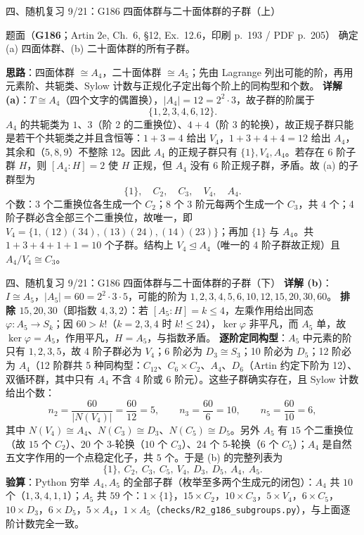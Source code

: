 \documentclass[aspectratio=169,10pt,fontset=none]{ctexbeamer}
\newcommand{\ex}[1]{\textcolor{accent}{\footnotesize\bfseries #1}}
\newcommand{\key}[1]{\textcolor{ink}{\bfseries #1}}
\begin{document}
\begin{frame}[t]{四、随机复习 9/21：G186 四面体群与二十面体群的子群（上）}
\label{ex:G186}
\scriptsize
\begin{block}{\footnotesize 题面（\ex{G186}；Artin 2e, Ch.~6, §12, Ex.~12.6，印刷 p.~193 / PDF p.~205）}
确定 (a) 四面体群、(b) 二十面体群的所有子群。
\end{block}
\key{思路}：四面体群 $\cong A_4$，二十面体群 $\cong A_5$；先由 Lagrange 列出可能的阶，再用元素阶、共轭类、Sylow 计数与正规化子定出每个阶上的同构型和个数。
\key{详解 (a)}：$T\cong A_4$（四个文字的偶置换），$|A_4|=12=2^2\cdot3$，故子群的阶属于
\[ \{1,2,3,4,6,12\}. \]
$A_4$ 的共轭类为 $1$、$3$（阶 2 的二重换位）、$4+4$（阶 3 的轮换），故正规子群只能是若干个共轭类之并且含恒等：$1+3=4$ 给出 $V_4$，$1+3+4+4=12$ 给出 $A_4$，其余和（$5,8,9$）不整除 $12$。因此 $A_4$ 的正规子群只有 $\{1\},V_4,A_4$。若存在 6 阶子群 $H$，则 $[A_4:H]=2$ 使 $H$ 正规，但 $A_4$ 没有 6 阶正规子群，矛盾。故 (a) 的子群型为
\[ \{1\},\quad C_2,\quad C_3,\quad V_4,\quad A_4. \]
个数：$3$ 个二重换位各生成一个 $C_2$；$8$ 个 3 阶元每两个生成一个 $C_3$，共 $4$ 个；4 阶子群必含全部三个二重换位，故唯一，即 $V_4=\{1,(12)(34),(13)(24),(14)(23)\}$；再加 $\{1\}$ 与 $A_4$。共 $1+3+4+1+1=10$ 个子群。结构上 $V_4\trianglelefteq A_4$（唯一的 4 阶子群故正规）且 $A_4/V_4\cong C_3$。
\end{frame}

\begin{frame}[t]{四、随机复习 9/21：G186 四面体群与二十面体群的子群（下）}
\scriptsize
\key{详解 (b)}：$I\cong A_5$，$|A_5|=60=2^2\cdot3\cdot5$，可能的阶为 $1,2,3,4,5,6,10,12,15,20,30,60$。
\textbf{排除 $15,20,30$}（即指数 $4,3,2$）：若 $[A_5:H]=k\le4$，左乘作用给出同态 $\varphi:A_5\to S_k$；因 $60>k!$（$k=2,3,4$ 时 $k!\le24$），$\ker\varphi$ 非平凡，而 $A_5$ 单，故 $\ker\varphi=A_5$，作用平凡，$H=A_5$，与指数矛盾。
\textbf{逐阶定同构型}：$A_5$ 中元素的阶只有 $1,2,3,5$，故 4 阶子群必为 $V_4$；6 阶必为 $D_3\cong S_3$；10 阶必为 $D_5$；12 阶必为 $A_4$（12 阶群共 5 种同构型：$C_{12}$、$C_6\times C_2$、$A_4$、$D_6$（Artin 约定下阶为 12）、双循环群，其中只有 $A_4$ 不含 4 阶或 6 阶元）。这些子群确实存在，且 Sylow 计数给出个数：
\[ n_2=\frac{60}{|N(V_4)|}=\frac{60}{12}=5,\qquad n_3=\frac{60}{6}=10,\qquad n_5=\frac{60}{10}=6, \]
其中 $N(V_4)\cong A_4$、$N(C_3)\cong D_3$、$N(C_5)\cong D_5$。另外 $A_5$ 有 $15$ 个二重换位（故 $15$ 个 $C_2$）、$20$ 个 3-轮换（$10$ 个 $C_3$）、$24$ 个 5-轮换（$6$ 个 $C_5$）；$A_4$ 是自然五文字作用的一个点稳定化子，共 $5$ 个。于是 (b) 的完整列表为
\[ \{1\},\ C_2,\ C_3,\ C_5,\ V_4,\ D_3,\ D_5,\ A_4,\ A_5. \]
\key{验算}：Python 穷举 $A_4,A_5$ 的全部子群（枚举至多两个生成元的闭包）：$A_4$ 共 $10$ 个（$1,3,4,1,1$）；$A_5$ 共 $59$ 个：$1\times\{1\}$，$15\times C_2$，$10\times C_3$，$5\times V_4$，$6\times C_5$，$10\times D_3$，$6\times D_5$，$5\times A_4$，$1\times A_5$（\texttt{checks/R2\_g186\_subgroups.py}），与上面逐阶计数完全一致。
\end{frame}
\end{document}
